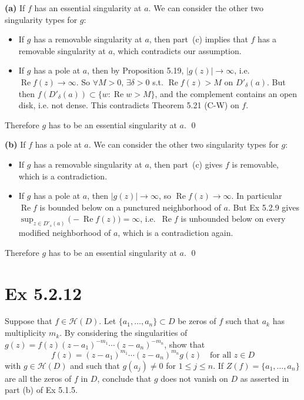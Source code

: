 \documentclass[a4paper]{article}
\newcommand{\Hol}{\mathcal{H}}
\renewcommand{\Re}{\operatorname{Re}}
\begin{document}
\medskip
\textbf{(a)} If $f$ has an essential singularity at $a$. We can consider the other two singularity types for $g$:
\begin{itemize}
\item If $g$ has a removable singularity at $a$, then part~(c) implies that $f$ has a
removable singularity at $a$, which contradicts our assumption.
\item If $g$ has a pole at $a$, then by Proposition 5.19, $|g(z)| \to \infty$, i.e.\
$\Re f(z) \to \infty$. So $\forall M > 0$, $\exists \delta > 0$ s.t.
$\Re f(z) > M$ on $D'_\delta(a)$. But then $f(D'_\delta(a)) \subset \{w : \Re w > M\}$,
and the complement contains an open disk, i.e. not dense. This contradicts
Theorem 5.21 (C-W) on $f$.
\end{itemize}
Therefore $g$ has to be an essential singularity at $a$. \qed

\medskip
\textbf{(b)} If $f$ has a pole at $a$. We can consider the other two singularity types for $g$:
\begin{itemize}
\item If $g$ has a removable singularity at $a$, then part~(c) gives $f$ is removable, which is a contradiction.
\item If $g$ has a pole at $a$, then $|g(z)| \to \infty$, so $\Re f(z) \to \infty$. In
particular $\Re f$ is bounded below on a punctured neighborhood of $a$. But Ex 5.2.9
gives $\sup_{z \in D'_s(a)} \big(-\Re f(z)\big) = \infty$, i.e.\ $\Re f$ is unbounded below on every modified neighborhood of $a$, which is a contradiction again.
\end{itemize}
Therefore $g$ has to be an essential singularity at $a$. \qed

\newpage
\section*{Ex 5.2.12}

\begin{tcolorbox}[colback=gray!10, colframe=black, boxrule=0.5pt, arc=2mm]
Suppose that $f \in \Hol(D)$. Let $\{a_1, \dots, a_n\} \subset D$ be zeros of $f$ such
that $a_k$ has multiplicity $m_k$. By considering the singularities of
$g(z) = f(z)(z-a_1)^{-m_1} \cdots (z-a_n)^{-m_n}$, show that
\[
f(z) = (z - a_1)^{m_1} \cdots (z - a_n)^{m_n} g(z) \quad \text{for all } z \in D
\]
with $g \in \Hol(D)$ and such that $g(a_j) \neq 0$ for $1 \leq j \leq n$. If
$Z(f) = \{a_1, \dots, a_n\}$ are all the zeros of $f$ in $D$, conclude that $g$ does
not vanish on $D$ as asserted in part (b) of Ex 5.1.5.
\end{tcolorbox}
\end{document}
